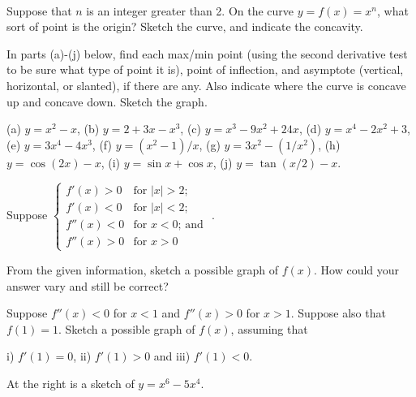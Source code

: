 %
%
\begin{homework}\
\label{homework:13}

\medskip

\begin{exercise} %
Suppose that $n$ is an integer greater than 2.  On the curve $y=f(x)=x^n$,
what sort of point is the origin?  Sketch the curve, and indicate the
concavity.

\smallskip

\begin{exercise} %
In parts (a)-(j) below, find each max/min point (using the second
derivative test to be sure what type of point it is), point of inflection,
and asymptote (vertical, horizontal, or slanted), if there are any.  Also
indicate where the curve is concave up and concave down.  Sketch the graph.

\noindent
(a) $y=x^2-x$, (b) $y=2+3x-x^3$, (c) $y=x^3-9x^2+24x$,
(d) $y=x^4-2x^2+3$, (e) $y=3x^4-4x^3$,
(f) $y=(x^2-1)/x$,
(g) $y=3x^2-(1/x^2)$, (h) $y=\cos(2x)-x$, (i) $y=\sin x+\cos x$,
(j) $y=\tan(x/2)-x$.

\smallskip

\begin{exercise} %
Suppose  $\begin{cases} f'(x) > 0& \text{for $|x| > 2$;}\\
                                  f'(x) < 0& \text{for $|x| < 2$;}\\
                                  f''(x) < 0& \text{for $x  < 0$; and }\\
                                  f''(x) > 0& \text{for  $x  > 0$}\end{cases}$.

\noindent
From the given information, sketch a possible graph of $f(x)$.
How could your answer vary and still be correct?


\smallskip

\begin{exercise} %
Suppose $f''(x) <0$ for $x<1$ and  $f''(x)>0$ for $x>1$.
Suppose also that $f(1)=1$.  Sketch a possible graph of $f(x)$, assuming that

         i) $f'(1) = 0$,   ii) $f'(1) > 0$ and  iii) $f'(1) < 0$.

\smallskip

\begin{rightindent}{3.4in}
\begin{exercise} %
At the right is a sketch of $y=x^6-5x^4$.


\end{exercise}
\end{rightindent}
\end{exercise}
\end{exercise}
\end{exercise}
\end{exercise}
\end{homework}

